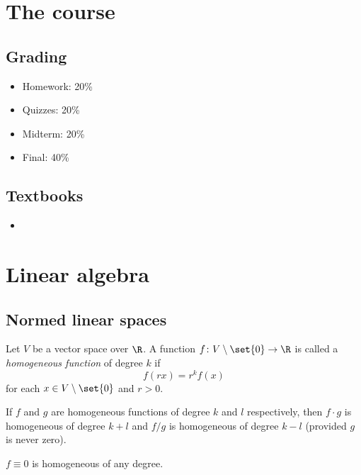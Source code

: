 \chapter*{The course} \label{chp:course}

\section*{Grading} \label{sec:grading}
\begin{itemize}
    \item Homework: 20\%
    \item Quizzes: 20\%
    \item Midterm: 20\%
    \item Final: 40\%
\end{itemize}

\section*{Textbooks} \label{sec:books}
\begin{itemize}
    \item 
\end{itemize}

\chapter{Linear algebra} \label{chp:linalg}

\section{Normed linear spaces} \label{sec:nls}


\begin{definition} \label{def:home}
    Let $V$ be a vector space over $\R$.
    A function $f\colon V \setminus \set{0} \to \R$ is called
    a \emph{homogeneous function} of degree $k$ if \[
        f(r x) = r^k f(x)
    \] for each $x \in V \setminus \set{0}$ and $r > 0$.
\end{definition}
\begin{remarks}
    \item If $f$ and $g$ are homogeneous functions of degree $k$ and $l$
    respectively, then $f \cdot g$ is homogeneous of degree $k + l$
    and $f / g$ is homogeneous of degree $k - l$
    (provided $g$ is never zero).
    \item $f \equiv 0$ is homogeneous of any degree.
\end{remarks}


